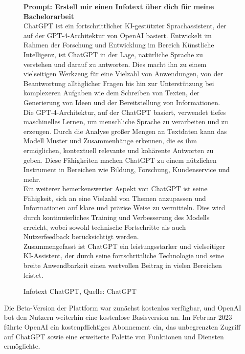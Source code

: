 \begin{figure} 
    \begin{tcolorbox}[colback=gray!20, colframe=gray!20, boxrule=0pt, sharp corners] 
    \textbf{Prompt: Erstell mir einen Infotext über dich für meine Bachelorarbeit}\\ 

    ChatGPT ist ein fortschrittlicher KI-gestützter Sprachassistent, der auf der GPT-4-Architektur von OpenAI basiert. 
    Entwickelt im Rahmen der Forschung und Entwicklung im Bereich Künstliche Intelligenz, ist ChatGPT in der Lage, 
    natürliche Sprache zu verstehen und darauf zu antworten. Dies macht ihn zu einem vielseitigen Werkzeug für eine 
    Vielzahl von Anwendungen, von der Beantwortung alltäglicher Fragen bis hin zur Unterstützung bei komplexeren 
    Aufgaben wie dem Schreiben von Texten, der Generierung von Ideen und der Bereitstellung von Informationen.\\
    
    Die GPT-4-Architektur, auf der ChatGPT basiert, verwendet tiefes maschinelles Lernen, um menschliche Sprache zu 
    verarbeiten und zu erzeugen. Durch die Analyse großer Mengen an Textdaten kann das Modell Muster und Zusammenhänge 
    erkennen, die es ihm ermöglichen, kontextuell relevante und kohärente Antworten zu geben. Diese Fähigkeiten machen 
    ChatGPT zu einem nützlichen Instrument in Bereichen wie Bildung, Forschung, Kundenservice und mehr.\\
    
    Ein weiterer bemerkenswerter Aspekt von ChatGPT ist seine Fähigkeit, sich an eine Vielzahl von Themen anzupassen 
    und Informationen auf klare und präzise Weise zu vermitteln. Dies wird durch kontinuierliches Training und 
    Verbesserung des Modells erreicht, wobei sowohl technische Fortschritte als auch Nutzerfeedback berücksichtigt 
    werden.\\
    
    Zusammengefasst ist ChatGPT ein leistungsstarker und vielseitiger KI-Assistent, der durch seine fortschrittliche 
    Technologie und seine breite Anwendbarkeit einen wertvollen Beitrag in vielen Bereichen leistet.\\
    \vfill
    \end{tcolorbox}
    \caption{Infotext ChatGPT, Quelle: ChatGPT}
    \label{InfotextChatGPT}
\end{figure}

Die Beta-Version der Plattform war zunächst kostenlos verfügbar, und OpenAI bot den Nutzern weiterhin eine kostenlose 
Basisversion an. Im Februar 2023 führte OpenAI ein kostenpflichtiges Abonnement ein, das unbegrenzten Zugriff auf ChatGPT 
sowie eine erweiterte Palette von Funktionen und Diensten ermöglichte.

